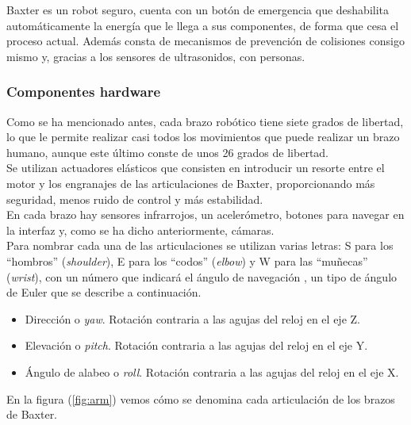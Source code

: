 \noindent Baxter es un robot seguro, cuenta con un botón de emergencia que deshabilita automáticamente la energía que le llega a sus componentes, de forma que cesa el proceso actual. Además consta de mecanismos de prevención de colisiones consigo mismo y, gracias a los sensores de ultrasonidos, con personas. \cite{Baxter3} \\


\subsubsection{Componentes hardware}
\label{chw}
\noindent Como se ha mencionado antes, cada brazo robótico \cite{Baxter4} tiene siete grados de libertad, lo que le permite realizar casi todos los movimientos que puede realizar un brazo humano, aunque este último conste de unos 26 grados de libertad. \\

\noindent Se utilizan actuadores elásticos que consisten en introducir un resorte entre el motor y los engranajes de las articulaciones de Baxter, proporcionando más seguridad, menos ruido de control y más estabilidad. \\

\noindent En cada brazo hay sensores infrarrojos, un acelerómetro, botones para navegar en la interfaz y, como se ha dicho anteriormente, cámaras. \\

\noindent Para nombrar cada una de las articulaciones se utilizan varias letras: S para los ``hombros'' (\textit{shoulder}), E para los ``codos'' (\textit{elbow}) y W para las ``muñecas'' (\textit{wrist}), con un número que indicará el ángulo de navegación \cite{AN}, un tipo de ángulo de Euler que se describe a continuación.

\begin{itemize}
	\item Dirección o \textit{yaw}. Rotación contraria a las agujas del reloj en el eje Z.
	\item Elevación o \textit{pitch}. Rotación contraria a las agujas del reloj en el eje Y.
	\item Ángulo de alabeo o \textit{roll}. Rotación contraria a las agujas del reloj en el eje X.
\end{itemize}

\noindent En la figura (\ref{fig:arm}) vemos cómo se denomina cada articulación de los brazos de Baxter.

